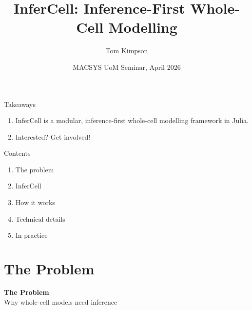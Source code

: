 \documentclass[aspectratio=169]{beamer}
\title[InferCell]{InferCell: Inference-First Whole-Cell Modelling}
\author{Tom Kimpson}
\institute{Department of Mathematics \& Statistics, \\ University of Melbourne}
\date[2026]{MACSYS UoM Seminar, April 2026}
\begin{document}
\begin{frame}[plain]
	\titlepage
\end{frame}


\begin{frame}{Takeaways}

	\begin{enumerate}\itemsep20pt

		\item \alert{InferCell} is a modular, inference-first whole-cell modelling framework in Julia.
		
		\item Interested? Get involved!
	\end{enumerate}
	

\end{frame}

\begin{frame}{Contents}
	
		\begin{enumerate}
		\item The problem
		\item InferCell
		\item How it works
		\item Technical details
		\item In practice
	\end{enumerate}
	
\end{frame}


\section{The Problem}

\begin{frame}[plain]
	\centering
	\vfill
	{\Large\bfseries The Problem}\\[10pt]
	{\large\color{gray} Why whole-cell models need inference}
	\vfill
\end{frame}
\end{document}

